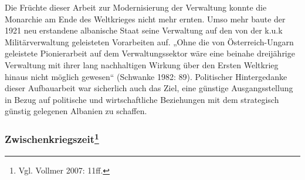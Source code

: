 Die Früchte dieser Arbeit zur Modernisierung der Verwaltung konnte die Monarchie am Ende des Weltkrieges nicht mehr ernten. Umso mehr baute der 1921 neu erstandene albanische Staat seine Verwaltung auf den von der k.u.k Militärverwaltung geleisteten Vorarbeiten auf. „Ohne die von Österreich-Ungarn geleistete Pionierarbeit auf dem Verwaltungssektor wäre eine beinahe dreijährige Verwaltung mit ihrer lang nachhaltigen Wirkung über den Ersten Weltkrieg hinaus nicht möglich gewesen“ (Schwanke 1982: 89). Politischer Hintergedanke dieser Aufbauarbeit war sicherlich auch das Ziel, eine günstige Ausgangsstellung in Bezug auf politische und wirtschaftliche Beziehungen mit dem strategisch günstig gelegenen Albanien zu schaffen.

\subsubsection[Zwischenkriegszeit]{Zwischenkriegszeit\footnote{Vgl. Vollmer 2007: 11ff.}}

